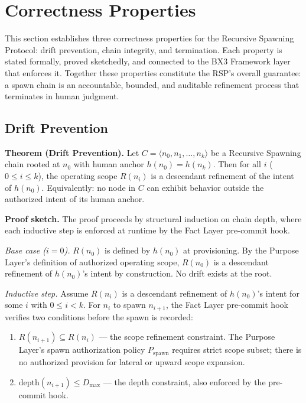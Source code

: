 \section{Correctness Properties}
\label{sec:rs-correctness}

This section establishes three correctness properties for the Recursive Spawning Protocol: drift prevention, chain integrity, and termination. Each property is stated formally, proved sketchedly, and connected to the BX3 Framework layer that enforces it. Together these properties constitute the RSP's overall guarantee: a spawn chain is an accountable, bounded, and auditable refinement process that terminates in human judgment.

\subsection{Drift Prevention}
\label{sec:rs-drift-prevention}

\medskip
\noindent\textbf{Theorem (Drift Prevention).} Let $C = \langle n_0, n_1, \ldots, n_k \rangle$ be a Recursive Spawning chain rooted at $n_0$ with human anchor $h(n_0) = h(n_k)$. Then for all $i$ ($0 \leq i \leq k$), the operating scope $R(n_i)$ is a descendant refinement of the intent of $h(n_0)$. Equivalently: no node in $C$ can exhibit behavior outside the authorized intent of its human anchor.

\medskip
\noindent\textbf{Proof sketch.} The proof proceeds by structural induction on chain depth, where each inductive step is enforced at runtime by the Fact Layer pre-commit hook.

\medskip
\textit{Base case ($i=0$).} $R(n_0)$ is defined by $h(n_0)$ at provisioning. By the Purpose Layer's definition of authorized operating scope, $R(n_0)$ is a descendant refinement of $h(n_0)$'s intent by construction. No drift exists at the root.

\medskip
\textit{Inductive step.} Assume $R(n_i)$ is a descendant refinement of $h(n_0)$'s intent for some $i$ with $0 \leq i < k$. For $n_i$ to spawn $n_{i+1}$, the Fact Layer pre-commit hook verifies two conditions before the spawn is recorded:

\begin{enumerate}
    \item[(a)] $R(n_{i+1}) \subseteq R(n_i)$ --- the scope refinement constraint. The Purpose Layer's spawn authorization policy $P_{\mathrm{spawn}}$ requires strict scope subset; there is no authorized provision for lateral or upward scope expansion.
    \item[(b)] $\mathrm{depth}(n_{i+1}) \leq D_{\mathrm{max}}$ --- the depth constraint, also enforced by the pre-commit hook.
\end{enumerate}

